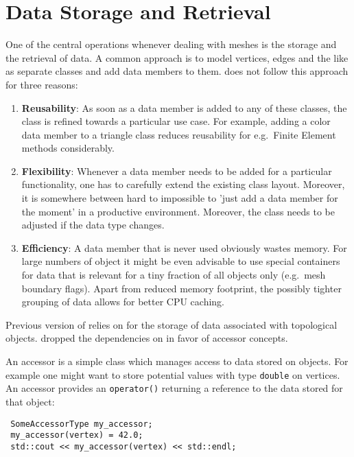 \chapter{Data Storage and Retrieval} \label{chap:data}

One of the central operations whenever dealing with meshes is the storage and the retrieval of data.
A common approach is to model vertices, edges and the like as separate classes and add data members to them.
{\ViennaGrid} does not follow this approach for three reasons:
\begin{enumerate}
 \item \textbf{Reusability}: As soon as a data member is added to any of these classes, the class is refined towards a particular use case. For example, adding a color data member to a triangle class reduces reusability for e.g.~Finite Element methods considerably.
 \item \textbf{Flexibility}: Whenever a data member needs to be added for a particular functionality, one has to carefully extend the existing class layout. Moreover, it is somewhere between hard to impossible to 'just add a data member for the moment' in a productive environment. Moreover, the class needs to be adjusted if the data type changes.
 \item \textbf{Efficiency}: A data member that is never used obviously wastes memory. For large numbers of object it might be even advisable to use special containers for data that is relevant for a tiny fraction of all objects only (e.g.~mesh boundary flags). Apart from reduced memory footprint, the possibly tighter grouping of data allows for better CPU caching. 
\end{enumerate}

Previous version of {\ViennaGrid} relies on {\ViennaData} \cite{ViennaData} for the storage of data associated with topological objects. {\ViennaGridversion} dropped the dependencies on {\ViennaData} in favor of accessor concepts.

An accessor is a simple class which manages access to data stored on objects. For example one might want to store potential values with type \lstinline|double| on vertices. An accessor provides an  \lstinline|operator()| returning a reference to the data stored for that object:

\begin{lstlisting}
 SomeAccessorType my_accessor;
 my_accessor(vertex) = 42.0;
 std::cout << my_accessor(vertex) << std::endl;
\end{lstlisting}

